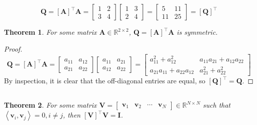 \documentclass[]{article}
\newtheorem{genthm}{Theorem}
\newcommand{\iprod}[2]{\left\langle #1, #2 \right\rangle}
\newcommand{\tpose}[1]{\left[#1\right]^{\! \top} \!\!}
\begin{document}
\subsection{}

\begin{equation}
	\bm{Q} = \tpose{\bm{A}} \bm{A} = \begin{bmatrix}
	1 & 2 \\
	3 & 4
	\end{bmatrix}
	\begin{bmatrix}
	1 & 3 \\
	2 & 4
	\end{bmatrix} = 
	\begin{bmatrix}
	5 & 11 \\
	11 & 25
	\end{bmatrix} = \tpose{\bm{Q}}
\end{equation}

\begin{genthm}
	For some matrix \(\bm{A} \in \mathbb{R}^{2 \times 2}\), \(\bm{Q} = \tpose{\bm{A}} \bm{A}\) is symmetric. 
\end{genthm}

\begin{proof}
\begin{equation}
	\bm{Q} = \tpose{\bm{A}} \bm{A} = \begin{bmatrix}
	a_{11} & a_{12} \\
	a_{21} & a_{22}
	\end{bmatrix}
	\begin{bmatrix}
	a_{11} & a_{21} \\
	a_{12} & a_{22}
	\end{bmatrix} = 
	\begin{bmatrix}
	a_{11}^2 + a_{12}^2 & a_{11} a_{21} + a_{12} a_{22} \\
	a_{21} a_{11} + a_{22} a_{12} & a_{21}^2 + a_{22}^2
	\end{bmatrix}
\end{equation}
By inspection, it is clear that the off-diagonal entries are equal, so \(\tpose{\bm{Q}} = \bm{Q}\). 
\end{proof}

\subsection{}

\begin{genthm}
	For some matrix \(\bm{V} = \begin{bmatrix}
	\bm{v}_1 & \bm{v}_2 & \cdots & \bm{v}_N
	\end{bmatrix} \in \mathbb{R}^{N \times N}\) such that  \(\iprod{\bm{v}_i}{\bm{v}_j} = 0, i \ne j\), then \(\tpose{\bm{V}} \bm{V} = \bm{I}\). 
\end{genthm}
\end{document}
